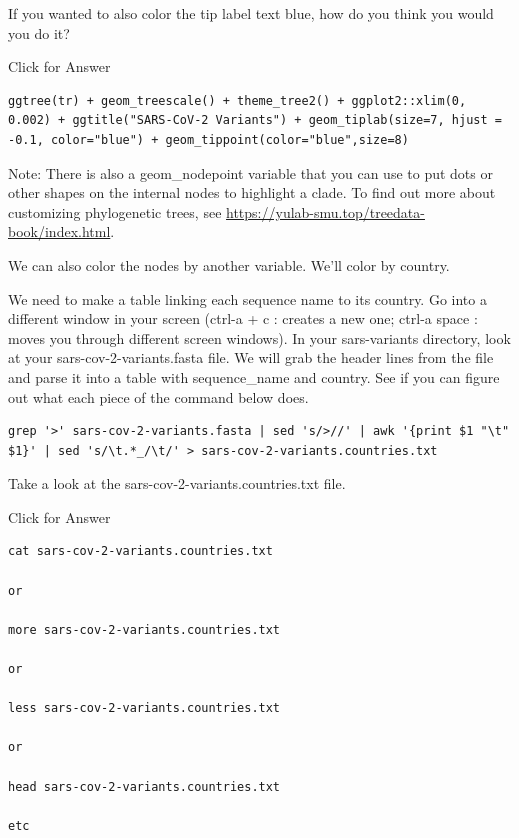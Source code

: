 \documentclass[
]{book}
\begin{document}
\hfill\break

If you wanted to also color the tip label text blue, how do you think you would you do it?

Click for Answer

\begin{verbatim}
ggtree(tr) + geom_treescale() + theme_tree2() + ggplot2::xlim(0, 0.002) + ggtitle("SARS-CoV-2 Variants") + geom_tiplab(size=7, hjust = -0.1, color="blue") + geom_tippoint(color="blue",size=8)
\end{verbatim}

\hfill\break

Note: There is also a geom\_nodepoint variable that you can use to put dots or other shapes on the internal nodes to highlight a clade. To find out more about customizing phylogenetic trees, see \url{https://yulab-smu.top/treedata-book/index.html}.

We can also color the nodes by another variable. We'll color by country.

We need to make a table linking each sequence name to its country. Go into a different window in your screen (ctrl-a + c : creates a new one; ctrl-a space : moves you through different screen windows). In your sars-variants directory, look at your sars-cov-2-variants.fasta file. We will grab the header lines from the file and parse it into a table with sequence\_name and country. See if you can figure out what each piece of the command below does.

\begin{verbatim}
grep '>' sars-cov-2-variants.fasta | sed 's/>//' | awk '{print $1 "\t" $1}' | sed 's/\t.*_/\t/' > sars-cov-2-variants.countries.txt
\end{verbatim}

Take a look at the sars-cov-2-variants.countries.txt file.

Click for Answer

\begin{verbatim}
cat sars-cov-2-variants.countries.txt

or 

more sars-cov-2-variants.countries.txt

or

less sars-cov-2-variants.countries.txt

or

head sars-cov-2-variants.countries.txt

etc
\end{verbatim}

\hfill\break
\end{document}

